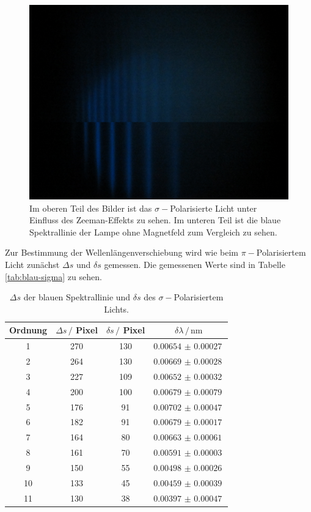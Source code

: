 \begin{figure}
    \centering
    \includegraphics[width=\textwidth]{content/data/Blue_sigma_0_uebernander.JPG}
    \caption{Im oberen Teil des Bilder ist das $\sigma -$Polarisierte Licht unter Einfluss des Zeeman-Effekts zu sehen. Im unteren Teil ist die blaue Spektrallinie der Lampe ohne Magnetfeld zum Vergleich zu sehen.}
    \label{fig:sigma-blau}
\end{figure}

Zur Bestimmung der Wellenlängenverschiebung wird wie beim $\pi -$Polarisiertem Licht zunächst $\Delta s$ und $\delta s$ gemessen.
Die gemessenen Werte sind in Tabelle \autoref{tab:blau-sigma} zu sehen.

\begin{table}
    \centering
    \caption{$\Delta s$ der blauen Spektrallinie und $\delta s$ des $\sigma -$Polarisiertem Lichts.}
    \begin{tabular}{cccc}
        \toprule
        Ordnung & $\Delta s \, / $ Pixel & $\delta s \, / $ Pixel & $\delta \lambda \, / \,\si{\nano\meter}$ \\
        \midrule
        1   &   270  &    130   & $\SI{0.00654(27)}{}$   \\
        2   &   264  &    130   & $\SI{0.00669(28)}{}$   \\
        3   &   227  &    109   & $\SI{0.00652(32)}{}$   \\
        4   &   200  &    100   & $\SI{0.00679(79)}{}$   \\
        5   &   176  &    91    & $\SI{0.00702(47)}{}$   \\
        6   &   182  &    91    & $\SI{0.00679(17)}{}$   \\
        7   &   164  &    80    & $\SI{0.00663(61)}{}$   \\
        8   &   161  &    70    & $\SI{0.00591(03)}{}$   \\
        9   &   150  &    55    & $\SI{0.00498(26)}{}$   \\
        10  &   133  &    45    & $\SI{0.00459(39)}{}$   \\
        11  &   130  &    38    & $\SI{0.00397(47)}{}$   \\
        \bottomrule
    \end{tabular}
    \label{tab:blau-sigma}
\end{table}

